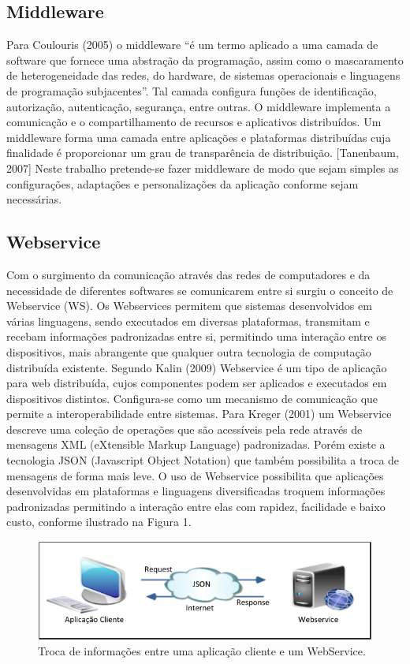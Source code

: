 \documentclass[12pt]{article}
\begin{document}
\subsection{Middleware}

Para Coulouris (2005) o middleware “é um termo aplicado a uma camada de software
que fornece uma abstração da programação, assim como o mascaramento de
heterogeneidade das redes, do hardware, de sistemas operacionais e linguagens de
programação subjacentes”. Tal camada configura funções de identificação, autorização,
autenticação, segurança, entre outras. O middleware implementa a comunicação e o
compartilhamento de recursos e aplicativos distribuídos.
Um middleware forma uma camada entre aplicações e plataformas distribuídas
cuja finalidade é proporcionar um grau de transparência de distribuição. [Tanenbaum,
2007]
Neste trabalho pretende-se fazer middleware de modo que sejam simples as
configurações, adaptações e personalizações da aplicação conforme sejam necessárias.

\subsection{Webservice}

Com o surgimento da comunicação através das redes de computadores e da necessidade
de diferentes softwares se comunicarem entre si surgiu o conceito de Webservice (WS).
Os Webservices permitem que sistemas desenvolvidos em várias linguagens,
sendo executados em diversas plataformas, transmitam e recebam informações
padronizadas entre si, permitindo uma interação entre os dispositivos, mais abrangente
que qualquer outra tecnologia de computação distribuída existente.
Segundo Kalin (2009) Webservice é um tipo de aplicação para web distribuída,
cujos componentes podem ser aplicados e executados em dispositivos distintos.
Configura-se como um mecanismo de comunicação que permite a interoperabilidade
entre sistemas. Para Kreger (2001) um Webservice descreve uma coleção de operações
que são acessíveis pela rede através de mensagens XML (eXtensible Markup Language)
padronizadas. Porém existe a tecnologia JSON (Javascript Object Notation) que
também possibilita a troca de mensagens de forma mais leve. O uso de Webservice
possibilita que aplicações desenvolvidas em plataformas e linguagens diversificadas
troquem informações padronizadas permitindo a interação entre elas com rapidez,
facilidade e baixo custo, conforme ilustrado na Figura 1.

\begin{figure}[ht]
	\centering
	\includegraphics[width=.5\textwidth]{figura1.png}
	\caption{Troca de informações entre uma aplicação cliente e um WebService.}
	\label{fig:exampleFigura1}
\end{figure}
\end{document}
